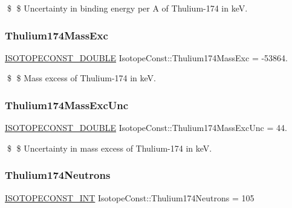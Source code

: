 \$ \$ Uncertainty in binding energy per A of Thulium-\/174 in keV. \mbox{\label{group___isotope_const-_thulium-_tm174_ga657f48e975859df709e8978c31ad862c}} 
\subsubsection{\texorpdfstring{Thulium174\+Mass\+Exc}{Thulium174MassExc}}
{\footnotesize\ttfamily \mbox{\hyperlink{group___isotope_const-_macros_ga8f45a7272ce02c0b4c65c44636ed719a}{I\+S\+O\+T\+O\+P\+E\+C\+O\+N\+S\+T\+\_\+\+D\+O\+U\+B\+LE}} Isotope\+Const\+::\+Thulium174\+Mass\+Exc = -\/53864.}

\$ \$ Mass excess of Thulium-\/174 in keV. \mbox{\label{group___isotope_const-_thulium-_tm174_ga09cf52428f972a9a3b13b37f824b9d1c}} 
\subsubsection{\texorpdfstring{Thulium174\+Mass\+Exc\+Unc}{Thulium174MassExcUnc}}
{\footnotesize\ttfamily \mbox{\hyperlink{group___isotope_const-_macros_ga8f45a7272ce02c0b4c65c44636ed719a}{I\+S\+O\+T\+O\+P\+E\+C\+O\+N\+S\+T\+\_\+\+D\+O\+U\+B\+LE}} Isotope\+Const\+::\+Thulium174\+Mass\+Exc\+Unc = 44.}

\$ \$ Uncertainty in mass excess of Thulium-\/174 in keV. \mbox{\label{group___isotope_const-_thulium-_tm174_gaa5c4d7c972cfc9165defc3ff686f8e30}} 
\subsubsection{\texorpdfstring{Thulium174\+Neutrons}{Thulium174Neutrons}}
{\footnotesize\ttfamily \mbox{\hyperlink{group___isotope_const-_macros_ga5f18360b3e99483a35c32d789e62621c}{I\+S\+O\+T\+O\+P\+E\+C\+O\+N\+S\+T\+\_\+\+I\+NT}} Isotope\+Const\+::\+Thulium174\+Neutrons = 105}

